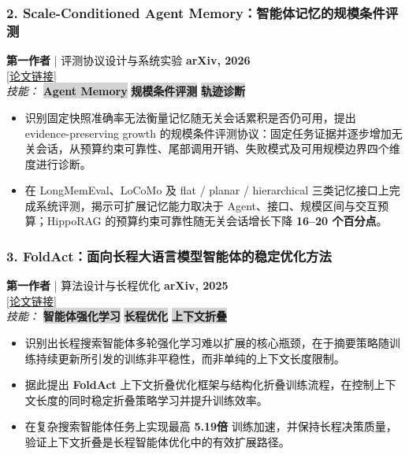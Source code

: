 \documentclass[10pt,a4paper]{article}
\newcommand{\skills}[1]{%
    \noindent\textit{\color{graytext}技能：}%
    \begingroup
    #1%
    \endgroup
}
\newcommand{\skilltag}[1]{%
    \setlength{\fboxsep}{3pt}%
    \setlength{\fboxrule}{0.5pt}%
    \colorbox{lightgray}{\color{itemcolor}\small\textbf{#1}}%
    \hspace{0.3em}%
}
\begin{document}
    \subsubsection*{2. \color{itemcolor}Scale-Conditioned Agent Memory：智能体记忆的规模条件评测}
    \noindent\textbf{\color{sectioncolor}第一作者} | 评测协议设计与系统实验 \hfill \color{accentcolor}\textbf{arXiv, 2026} \\
    \noindent\href{https://arxiv.org/abs/2605.07313}{\color{linkcolor}[论文链接]} \\
    \skills{\skilltag{Agent Memory} \skilltag{规模条件评测} \skilltag{轨迹诊断}}
    \begin{itemize}[leftmargin=*, label=\textcolor{accentcolor}{\textbullet}, itemsep=0.2em]
        \item 识别固定快照准确率无法衡量记忆随无关会话累积是否仍可用，提出 evidence-preserving growth 的规模条件评测协议：固定任务证据并逐步增加无关会话，从预算约束可靠性、尾部调用开销、失败模式及可用规模边界四个维度进行诊断。
        \item 在 LongMemEval、LoCoMo 及 flat / planar / hierarchical 三类记忆接口上完成系统评测，揭示可扩展记忆能力取决于 Agent、接口、规模区间与交互预算；HippoRAG 的预算约束可靠性随无关会话增长下降 \textbf{16--20 个百分点}。
    \end{itemize}
    \subsubsection*{3. \color{itemcolor}FoldAct：面向长程大语言模型智能体的稳定优化方法}
    \noindent\textbf{\color{sectioncolor}第一作者} | 算法设计与长程优化 \hfill \color{accentcolor}\textbf{arXiv, 2025} \\
    \noindent\href{https://arxiv.org/abs/2512.22733}{\color{linkcolor}[论文链接]} \\
    \skills{\skilltag{智能体强化学习} \skilltag{长程优化} \skilltag{上下文折叠}} 
    \begin{itemize}[leftmargin=*, label=\textcolor{accentcolor}{\textbullet}, itemsep=0.2em]
        \item 识别出长程搜索智能体多轮强化学习难以扩展的核心瓶颈，在于摘要策略随训练持续更新所引发的训练非平稳性，而非单纯的上下文长度限制。
        \item 据此提出 \textbf{FoldAct} 上下文折叠优化框架与结构化折叠训练流程，在控制上下文长度的同时稳定折叠策略学习并提升训练效率。
        \item 在复杂搜索智能体任务上实现最高 \textbf{5.19倍} 训练加速，并保持长程决策质量，验证上下文折叠是长程智能体优化中的有效扩展路径。
    \end{itemize}
\end{document}
